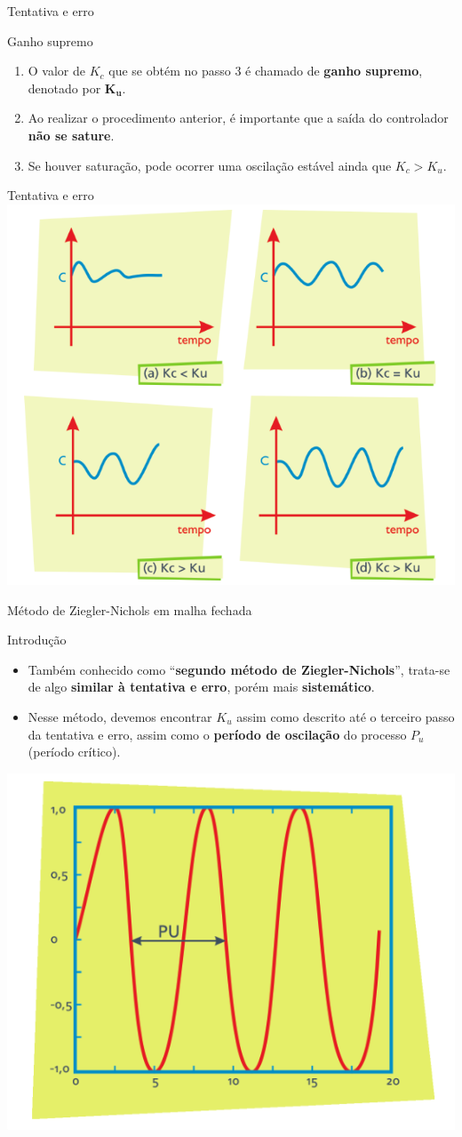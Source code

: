 \begin{frame}{Tentativa e erro}
	\begin{block}{Ganho supremo}
		\begin{enumerate}
			\item O valor de $ K_c $ que se obtém no passo 3 é chamado de \textbf{ganho supremo},
			denotado por $ \bm{K_u} $.
			\item Ao realizar o procedimento anterior, é importante que a saída do controlador
			\textbf{não se sature}.
			\item Se houver saturação, pode ocorrer uma oscilação estável ainda
			que $ K_c > K_u $.
		\end{enumerate}
	\end{block}
\end{frame}


\begin{frame}{Tentativa e erro}
	\centering
	\includegraphics[width=0.7\linewidth]{Figuras/Ch14/fig2}
\end{frame}


\begin{frame}{Método de Ziegler-Nichols em malha fechada}
	\begin{block}{Introdução}
		\begin{itemize}
			\item Também conhecido como ``\textbf{segundo método de Ziegler-Nichols}'', trata-se de algo \textbf{similar à tentativa e erro}, porém mais \textbf{sistemático}.
			\item Nesse método, devemos encontrar $ K_u $ assim como descrito até o terceiro passo da tentativa e erro, assim como o \textbf{período de oscilação} do processo $ P_u $ (período crítico).
		\end{itemize}
	\end{block}

	\centering
	\includegraphics[width=0.5\linewidth]{Figuras/Ch14/fig3}
	
\end{frame}


